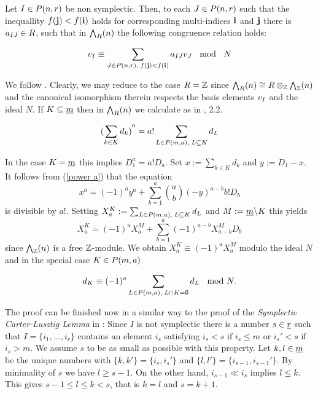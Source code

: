 \documentclass[twoside,12pt]{article}
\begin{document}
\begin{lem} \label{Rel nicht symplektisch}
Let $I\in P({n},{r})$ be non symplectic. Then, to each $J\in P({n},{r})$
such that the inequallity $f({\bf j})<f({\bf i})$ holds
for corresponding multi-indices ${\bf i}$ and ${\bf j}$ there is 
$a_{IJ}\in R$, such that in ${\bigwedge}_{R}(n)$ the
following congruence relation holds:

\[ v_{I}\equiv
\sum_{J\in P({n},{r}), \; f({\bf j})<f({\bf i})}a_{IJ}v_{J}  \;\; \mbox{
  mod }
\;\; N \]

\end{lem}
 

\begin{Pf} We follow \cite{donk1}.
Clearly, we may reduce to the case $R ={\mathbb Z}$ since 
${\bigwedge}_{R}(n)\cong R \otimes_{{\mathbb Z}} {\bigwedge}_{{\mathbb Z}}(n)$ and the canonical isomorphism
therein respects the basis elements $v_{I}$ and the ideal $N$.
If $K\subseteq \underline{m}$
then in ${\bigwedge}_{R}(n)$ we calculate as in \cite{donk1}, 2.2.

\begin{equation}
\label{power a}
{(\sum_{k \in K}d_k)}^a=a!\sum_{L\in P({m},{a}),\; L\subseteq K} d_L
\end{equation}

In the case $K=\underline{m}$ this implies $D_1^a=a!D_a$.
Set $x:=\sum_{k \in K}d_k$ and $y:=D_1 -x$.
It follows from (\ref{power a}) that the equation 
\[ x^a=(-1)^ay^a+\sum_{b=1}^a { a \choose b} (-y)^{a-b}b!D_b \]
is divisible by $a!$.
Setting $X^K_a:=\sum_{L\in P({m},{a}),\; L\subseteq K}d_L$ and $M:=\underline{m}\backslash K$
this yields
\[ X^K_a=(-1)^aX^M_a+\sum_{b=1}^a  (-1)^{a-b}X^M_{a-b}D_b\]
since ${\bigwedge}_{{\mathbb Z}}(n)$ is a free ${\mathbb Z}$-module.
We obtain $X^K_a\equiv (-1)^aX^M_a$ modulo the ideal $N$ and in the
special case $K \in P({m},{a})$

\begin{equation}
\label{formel d_J}
d_K\equiv (-1)^a\sum_{L\in P({m},{a}),\; L\cap K=\emptyset}d_L \;\;\mbox{
  mod } N.
\end{equation}

The proof can be finished now in a similar way to the proof of the
{\em Symplectic Carter-Lusztig Lemma} in \cite{donk1}:
Since $I$ is not symplectic there is a number $s\in \underline{r}$
such that $I=\{i_1,\ldots , i_r\}$ contains an element $i_s$ satisfying
$i_s<s$ if $i_s \leq m$ or $i_s'<s$ if $i_s>m$. We assume $s$ to be
as small as possible with this property.
Let $k, l\in \underline{m}$
be the unique numbers with $\{k, k'\}=\{i_s, i_s'\}$ and
$\{l, l'\}=\{i_{s-1}, i_{s-1}'\}$. By minimality of $s$ we have $l
\geq s-1$. On the other hand, $i_{s-1}\ll i_s$ implies $l\leq k$.
This gives $s-1\leq l \leq k < s$, that is $k=l$ and $s=k+1$.\Ab


\end{Pf}
\end{document}
